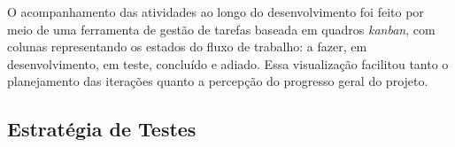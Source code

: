 O acompanhamento das atividades ao longo do desenvolvimento foi feito por meio de uma ferramenta de gestão de tarefas baseada em quadros \textit{kanban}, com colunas representando os estados do fluxo de trabalho: a fazer, em desenvolvimento, em teste, concluído e adiado. Essa visualização facilitou tanto o planejamento das iterações quanto a percepção do progresso geral do projeto.


\subsection{Estratégia de Testes}


